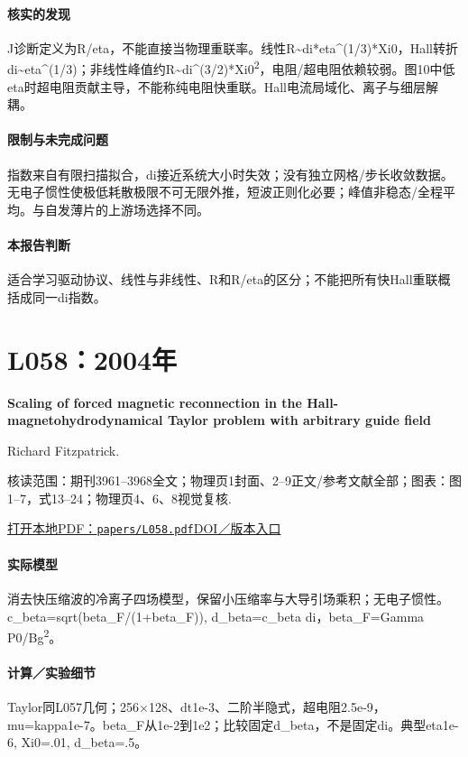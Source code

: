 \paragraph{核实的发现}J诊断定义为R/eta，不能直接当物理重联率。线性R\textasciitilde{}di*eta\textasciicircum{}(1/3)*Xi0，Hall转折di\textasciitilde{}eta\textasciicircum{}(1/3)；非线性峰值约R\textasciitilde{}di\textasciicircum{}(3/2)*Xi0\textsuperscript{2}，电阻/超电阻依赖较弱。图10中低eta时超电阻贡献主导，不能称纯电阻快重联。Hall电流局域化、离子与细层解耦。

\paragraph{限制与未完成问题}指数来自有限扫描拟合，di接近系统大小时失效；没有独立网格/步长收敛数据。无电子惯性使极低耗散极限不可无限外推，短波正则化必要；峰值非稳态/全程平均。与自发薄片的上游场选择不同。

\paragraph{本报告判断}适合学习驱动协议、线性与非线性、R和R/eta的区分；不能把所有快Hall重联概括成同一di指数。

\section{L058：2004年}\label{paper:L058}

\textbf{Scaling of forced magnetic reconnection in the Hall-magnetohydrodynamical Taylor problem with arbitrary guide field}\citep{L058}\

Richard Fitzpatrick.

\textsf{核读范围：}期刊3961–3968全文；物理页1封面、2–9正文/参考文献全部；\textsf{图表：}图1–7，式13–24；物理页4、6、8视觉复核.

\href{run:papers/L058.pdf}{打开本地PDF：\texttt{papers/L058.pdf}}\quad\href{https://doi.org/10.1063/1.1768956}{DOI／版本入口}

\paragraph{实际模型}消去快压缩波的冷离子四场模型，保留小压缩率与大导引场乘积；无电子惯性。c\_beta=sqrt(beta\_F/(1+beta\_F)), d\_beta=c\_beta di，beta\_F=Gamma P0/Bg\textsuperscript{2}。

\paragraph{计算／实验细节}Taylor同L057几何；256×128、dt1e-3、二阶半隐式，超电阻2.5e-9，mu=kappa1e-7。beta\_F从1e-2到1e2；比较固定d\_beta，不是固定di。典型eta1e-6, Xi0=.01, d\_beta=.5。

